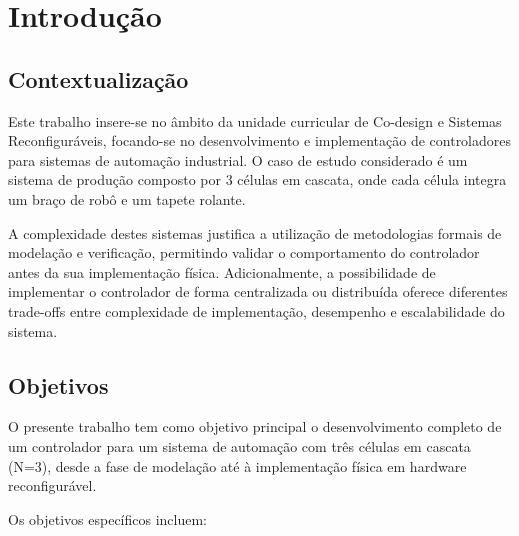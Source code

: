 \section{Introdução}

\subsection{Contextualização}

Este trabalho insere-se no âmbito da unidade curricular de Co-design e Sistemas Reconfiguráveis, focando-se no desenvolvimento e implementação de controladores para sistemas de automação industrial. O caso de estudo considerado é um sistema de produção composto por 3 células em cascata, onde cada célula integra um braço de robô e um tapete rolante.

A complexidade destes sistemas justifica a utilização de metodologias formais de modelação e verificação, permitindo validar o comportamento do controlador antes da sua implementação física. Adicionalmente, a possibilidade de implementar o controlador de forma centralizada ou distribuída oferece diferentes trade-offs entre complexidade de implementação, desempenho e escalabilidade do sistema.

\subsection{Objetivos}
O presente trabalho tem como objetivo principal o desenvolvimento completo de um controlador para um sistema de automação com três células em cascata (N=3), desde a fase de modelação até à implementação física em hardware reconfigurável.

Os objetivos específicos incluem:

